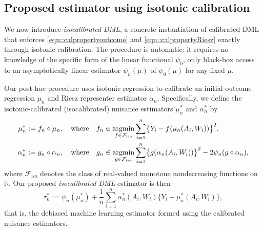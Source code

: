 \documentclass[11pt]{article}
\theoremstyle{plain}
\DeclareMathOperator*{\argmin}{argmin}
\begin{document}
 
\subsection{Proposed estimator using isotonic calibration}

 We now introduce \emph{isocalibrated DML}, a concrete instantiation of calibrated DML that enforces \eqref{eqn::calpropertyoutcome} and \eqref{eqn::calpropertyRiesz} exactly through isotonic calibration. The procedure is automatic: it requires no knowledge of the specific form of
the linear functional \(\psi_0\), only black-box access to an asymptotically
linear estimator \(\psi_n(\mu)\) of \(\psi_0(\mu)\) for any fixed \(\mu\). %



Our post-hoc procedure uses isotonic regression \citep{barlow1972isotonic} to
calibrate an initial outcome regression \(\mu_n\) and Riesz representer
estimator \(\alpha_n\).
Specifically, we define the isotonic-calibrated (isocalibrated) nuisance
estimators \(\mu_n^*\) and \(\alpha_n^*\) by
\begin{equation}
\begin{aligned}
\mu_n^* := f_n \circ \mu_n, \quad \textnormal{where}\quad
f_n &\in \argmin_{f \in \mathcal{F}_{\text{iso}}}
\sum_{i=1}^n \bigl\{ Y_i - f(\mu_n(A_i, W_i))\bigr\}^2, \\
\alpha_n^* := g_n \circ \alpha_n, \quad \textnormal{where}\quad
g_n &\in \argmin_{g \in \mathcal{F}_{\text{iso}}}
\sum_{i=1}^n \bigl\{ g(\alpha_n(A_i, W_i))\bigr\}^2
- 2\psi_n(g \circ \alpha_n),
\end{aligned}
\label{eqn::metastep}
\end{equation}
where \(\mathcal{F}_{\text{iso}}\) denotes the class of real-valued monotone
nondecreasing functions on \(\mathbb{R}\). Our proposed
\emph{isocalibrated DML} estimator is then
\begin{equation}
\tau_n^* := \psi_n(\mu_n^*) + \frac{1}{n}\sum_{i=1}^n
\alpha_n^*(A_i,W_i)\{Y_i - \mu_n^*(A_i,W_i)\},
\label{eqn::ICDRnot}
\end{equation}
that is, the debiased machine learning estimator formed using the calibrated
nuisance estimators.  
\end{document}
